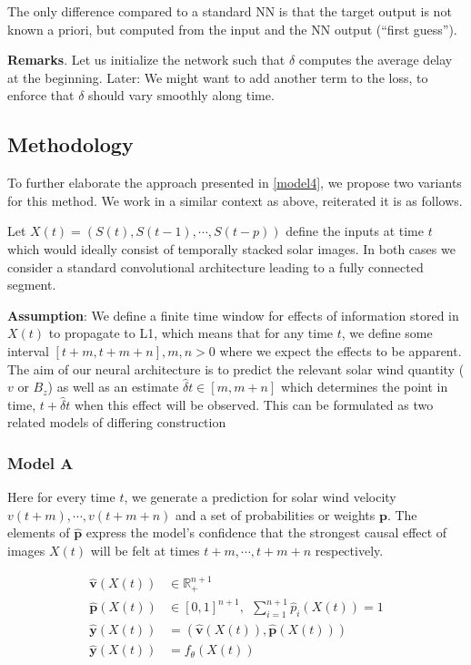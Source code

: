 \documentclass[]{article}
\theoremstyle{definition}
\begin{document}
The only difference compared to a standard NN is that the target output is not known a priori, but computed from the input and the NN output (``first guess''). 

\textbf{Remarks}. Let us initialize the network such that $\delta$ computes the average delay at the beginning. Later: We might want to add another term to the loss, to enforce that $\delta$ should vary smoothly along time.

\subsection*{Methodology}

To further elaborate the approach presented in \ref{model4}, we propose two variants for this method. We work in a similar context as above, reiterated it is as follows.

Let $X(t) = (S(t), S(t-1), \cdots, S(t-p))$ define the inputs at time $t$ which would ideally consist of temporally stacked solar images. In both cases we consider a standard convolutional architecture leading to a fully connected segment.

\textbf{Assumption}: We define a finite time window for effects of information stored in $X(t)$ to propagate to L1, which means that for any time $t$, we define some interval $[t+m, t+m+n], m,n > 0$ where we expect the effects to be apparent. The aim of our neural architecture is to predict the relevant solar wind quantity ($v$ or $B_z$) as well as an estimate $\hat{\delta} t \in [m, m+n]$ which determines the point in time, $t+\hat{\delta} t$ when this effect will be observed. This can be formulated as two related models of differing construction

\subsubsection*{Model A}

Here for every time $t$, we generate a prediction for solar wind velocity $v(t+m) , \cdots, v(t+m+n)$ and a set of probabilities or weights $\mathbf{p}$. The elements of $\mathbf{\hat{p}}$ express the model's confidence that the strongest causal effect of images $X(t)$ will be felt at times $t+m, \cdots, t+m+n$ respectively.

\begin{align*}
    \mathbf{\hat{v}}(X(t))  & \in \mathbb{R}_{+}^{n+1}\\
    \mathbf{\hat{p}}(X(t))  & \in [0, 1]^{n+1}, \ \ \sum_{i = 1}^{n+1}{\hat{p}_{i}(X(t))} = 1\\
    \mathbf{\hat{y}}(X(t))  & = (\mathbf{\hat{v}}(X(t)), \mathbf{\hat{p}}(X(t)))\\
    \mathbf{\hat{y}}(X(t))  & = f_{\theta}(X(t))
\end{align*}
\end{document}
